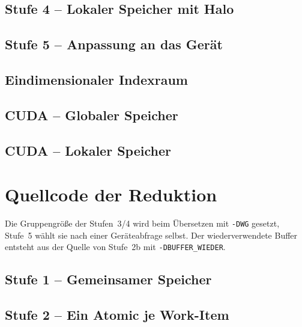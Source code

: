 \documentclass[12pt,a4paper]{article}
\begin{document}
\subsection{Stufe 4 -- Lokaler Speicher mit Halo}


\subsection{Stufe 5 -- Anpassung an das Gerät}


\subsection{Eindimensionaler Indexraum}


\subsection{CUDA -- Globaler Speicher}


\subsection{CUDA -- Lokaler Speicher}


\newpage
\section{Quellcode der Reduktion}\label{sec:anhang-reduktion}

Die Gruppengröße der Stufen~3/4 wird beim Übersetzen mit \texttt{-DWG}
gesetzt, Stufe~5 wählt sie nach einer Geräteabfrage selbst. Der
wiederverwendete Buffer entsteht aus der Quelle von Stufe~2b mit
\texttt{-DBUFFER\_WIEDER}.

\subsection{Stufe 1 -- Gemeinsamer Speicher}


\subsection{Stufe 2 -- Ein Atomic je Work-Item}

\end{document}
